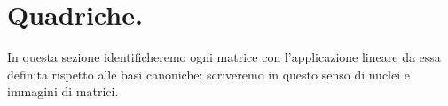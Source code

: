 \section{Quadriche.}
	\par In questa sezione identificheremo ogni matrice con l'applicazione lineare da essa definita rispetto alle basi canoniche: scriveremo in questo senso di nuclei e immagini di matrici.


